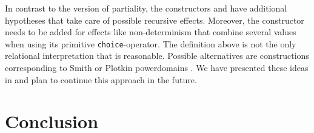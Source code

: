 In contrast to the version of partiality, the constructors  and  have additional hypotheses that take care of possible recursive effects.
Moreover, the constructor  needs to be added for effects like non\--determinism that combine several values when using its primitive \texttt{choice}\--operator.
The definition above is not the only relational interpretation that is reasonable.
Possible alternatives are constructions corresponding to Smith or Plotkin powerdomains \citep{abramsky1994domain}.
We have presented these ideas in \citet{christiansen2019proving} and plan to continue this approach in the future.

\section{Conclusion}
\label{sec:conclusion}

